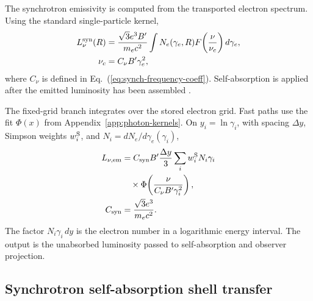 \documentclass[twocolumn]{aastex702}
\begin{document}
The synchrotron emissivity is computed from the transported electron spectrum.
Using the standard single-particle kernel,
\begin{equation}
\begin{aligned}
L_\nu^{\rm syn}(R)&=
\frac{\sqrt{3}e^3B'}{m_e c^2}
\int N_e(\gamma_e,R)
F\!\left(\frac{\nu}{\nu_c}\right)d\gamma_e,\\
\nu_c&=C_\nu B'\gamma_e^2,
\end{aligned}
\end{equation}
where \(C_\nu\) is defined in Eq.~(\ref{eq:synch-frequency-coeff}).  Self-absorption
is applied after the emitted luminosity has been assembled
\citep{RybickiLightman1979,Sari1998,Granot2002}.

The fixed-grid branch integrates over the stored electron grid.  Fast paths use
the fit \(\Phi(x)\) from Appendix~\ref{app:photon-kernels}.  On
\(y_i=\ln\gamma_i\), with spacing \(\Delta y\), Simpson weights \(w_i^{\rm S}\),
and \(N_i=dN_e/d\gamma_e(\gamma_i)\),
\begin{equation}
\begin{aligned}
L_{\nu,{\rm em}}&=
C_{\rm syn}B'\frac{\Delta y}{3}
\sum_i w_i^{\rm S}N_i\gamma_i\\
&\quad\times
\Phi\!\left(\frac{\nu}{C_\nu B'\gamma_i^2}\right),\\
C_{\rm syn}&=\frac{\sqrt{3}e^3}{m_e c^2}.
\end{aligned}
\end{equation}
The factor \(N_i\gamma_i\,dy\) is the electron number in a logarithmic energy
interval.  The output is the unabsorbed luminosity passed to self-absorption and
observer projection.

\subsection{Synchrotron self-absorption shell transfer}
\label{sec:syn-shell-transfer}
\end{document}
